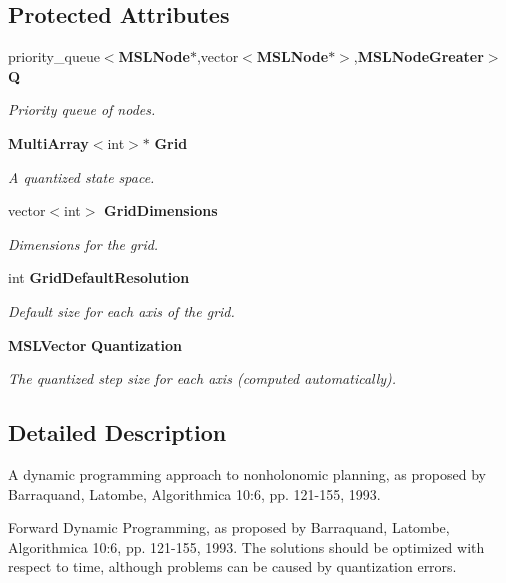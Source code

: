 \subsection*{Protected Attributes}
\begin{CompactItemize}
\item 
priority\_\-queue$<${\bf MSLNode}$\ast$,vector$<${\bf MSLNode}$\ast$$>$,{\bf MSLNode\-Greater}$>$ {\bf Q}
\begin{CompactList}\small\item\em Priority queue of nodes.\item\end{CompactList}\item 
{\bf Multi\-Array}$<$int$>$$\ast$ {\bf Grid}
\begin{CompactList}\small\item\em A quantized state space.\item\end{CompactList}\item 
vector$<$int$>$ {\bf Grid\-Dimensions}
\begin{CompactList}\small\item\em Dimensions for the grid.\item\end{CompactList}\item 
int {\bf Grid\-Default\-Resolution}
\begin{CompactList}\small\item\em Default size for each axis of the grid.\item\end{CompactList}\item 
{\bf MSLVector} {\bf Quantization}
\begin{CompactList}\small\item\em The quantized step size for each axis (computed automatically).\item\end{CompactList}\end{CompactItemize}


\subsection{Detailed Description}
A dynamic programming approach to nonholonomic planning, as proposed by Barraquand, Latombe, Algorithmica 10:6, pp. 121-155, 1993.

Forward Dynamic Programming, as proposed by Barraquand, Latombe,  Algorithmica 10:6, pp. 121-155, 1993. The solutions should be optimized  with respect to time, although problems can be caused by quantization  errors.

